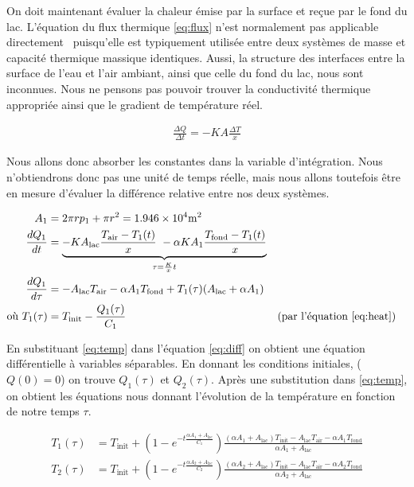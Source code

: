 \documentclass[12pt]{article}
\numberwithin{figure}{section}
\numberwithin{table}{section}
\begin{document}
On doit maintenant \'evaluer la chaleur \'emise par la surface et re\c cue par le fond du lac.
L'\'equation du flux thermique \eqref{eq:flux} n'est normalement pas applicable
directement~\cite{HeatFlow} puisqu'elle est typiquement utilis\'ee entre deux syst\`emes de masse et
capacit\'e thermique massique identiques. Aussi, la structure des interfaces entre la surface de
l'eau et l'air ambiant, ainsi que celle du fond du lac, nous sont inconnues. Nous ne pensons pas
pouvoir trouver la conductivit\'e thermique appropri\'ee ainsi que le gradient de temp\'erature
r\'eel.

\begin{align}
    \frac{\Delta Q}{\Delta t} = -KA\frac{\Delta T}x \label{eq:flux}
\end{align}

Nous allons donc absorber les constantes dans la variable d'int\'egration. Nous n'obtiendrons donc
pas une unit\'e de temps r\'eelle, mais nous allons toutefois \^etre en mesure d'\'evaluer la
diff\'erence relative entre nos deux syst\`emes.

\begin{align}
    A_1 &= 2\pi r p_1 + \pi r^2 = \num{1.946e4}\si{\square\meter}\notag\\
    \frac{dQ_1}{dt} &=
        \underbrace{-KA_\text{lac}\frac{T_\text{air}-T_1(t)}x\
            -\alpha KA_1\frac{T_\text{fond}-T_1(t)}x}_{\tau = \frac Kxt}\notag\\
    \frac{dQ_1}{d\tau} &= -A_\text{lac}T_\text{air}-\alpha A_1 T_\text{fond} + T_1(\tau)(A_\text{lac}+ \alpha A_1)\label{eq:diff}\\
    \text{o\`u } T_1(\tau) &= T_\text{init} - \frac{Q_1(\tau)}{C_1} \label{eq:temp}&&\text{(par l'\'equation \eqref{eq:heat})}
\end{align}

En substituant \eqref{eq:temp} dans l'\'equation \eqref{eq:diff} on obtient une \'equation
diff\'erentielle \`a variables s\'eparables. En donnant les conditions initiales, ($Q(0) = 0$) on
trouve $Q_1(\tau)$ et $Q_2(\tau)$. Apr\`es une substitution dans \eqref{eq:temp}, on obtient les
\'equations nous donnant l'\'evolution de la temp\'erature en fonction de notre temps $\tau$.

\begin{align*}
    T_1(\tau) &=
        T_\text{init} +
            \left(1-e^{\textstyle -t\frac{\alpha A_1+A_\text{lac}}{C_1}}\right)
            \frac
                {(\alpha A_1+A_\text{lac})T_\text{init} - A_\text{lac} T_\text{air} - \alpha A_1 T_\text{fond}}
                {\alpha A_1+A_\text{lac}}\\
    T_2(\tau) &=
        T_\text{init} +
            \left(1-e^{\textstyle -t\frac{\alpha A_2+A_\text{lac}}{C_2}}\right)
            \frac
                {(\alpha A_2+A_\text{lac})T_\text{init} - A_\text{lac} T_\text{air} - \alpha A_2 T_\text{fond}}
                {\alpha A_2+A_\text{lac}}\\
\end{align*}
\end{document}
